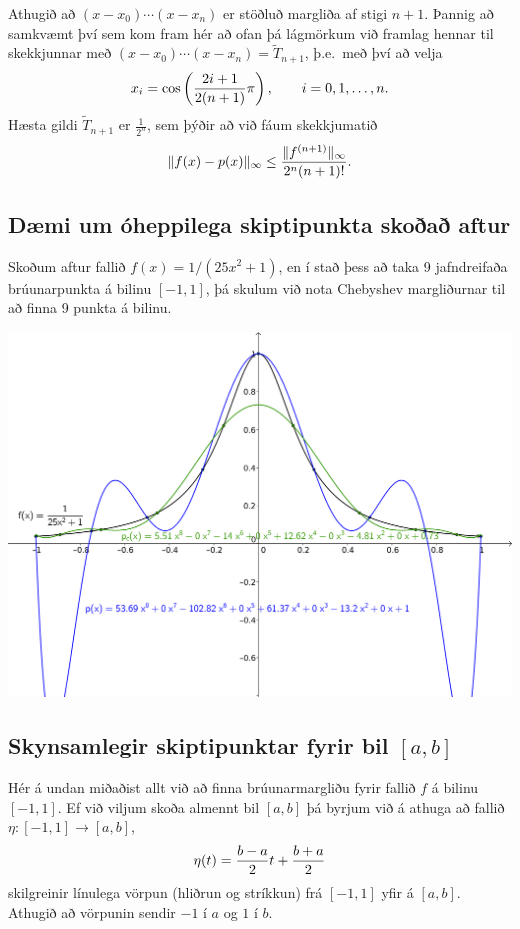 \documentclass[A4paper,10pt,icelandic]{sphinxmanual}
\begin{document}
Athugið að \((x-x_0)\cdots (x-x_n)\) er stöðluð margliða af stigi
\(n+1\). Þannig að samkvæmt því sem kom fram hér að
ofan þá lágmörkum við framlag hennar
til skekkjunnar með \((x-x_0)\cdots (x-x_n) = \tilde T_{n+1}\),
þ.e. með því að velja
\begin{gather}
\begin{split}x_i = \cos\left(\frac{2i+1}{2(n+1)}\pi\right), \qquad i=0,1,\ldots,n.\end{split}\notag
\end{gather}
Hæsta gildi \(\tilde T_{n+1}\) er \(\frac 1{2^n}\), sem þýðir að
við fáum skekkjumatið
\begin{gather}
\begin{split}\|f(x)-p(x)\|_\infty \leq \frac{\|f^{(n+1)}\|_\infty}{2^n(n+1)!}.\end{split}\notag
\end{gather}

\subsection{Dæmi um óheppilega skiptipunkta skoðað aftur}
\label{kafli03:daemi-um-oheppilega-skiptipunkta-skoa-aftur}
Skoðum aftur fallið \(f(x) = 1/(25x^2+1)\), en í stað þess að taka 9
jafndreifaða brúunarpunkta á bilinu \([-1,1]\), þá skulum við nota
Chebyshev margliðurnar til að finna 9 punkta á bilinu.

\includegraphics{vond_bruun2.png}


\subsection{Skynsamlegir skiptipunktar fyrir bil \([a,b]\)}
\label{kafli03:skynsamlegir-skiptipunktar-fyrir-bil}
Hér á undan miðaðist allt við að finna brúunarmargliðu fyrir fallið
\(f\) á bilinu \([-1,1]\). Ef við viljum skoða almennt bil
\([a,b]\) þá byrjum við á athuga að fallið
\(\eta:[-1,1]\to [a,b]\),
\begin{gather}
\begin{split}\eta(t) = \frac{b-a}2 t + \frac{b+a}2\end{split}\notag
\end{gather}
skilgreinir línulega vörpun (hliðrun og stríkkun) frá \([-1,1]\)
yfir á \([a,b]\). Athugið að vörpunin sendir \(-1\) í \(a\)
og \(1\) í \(b\).
\end{document}
